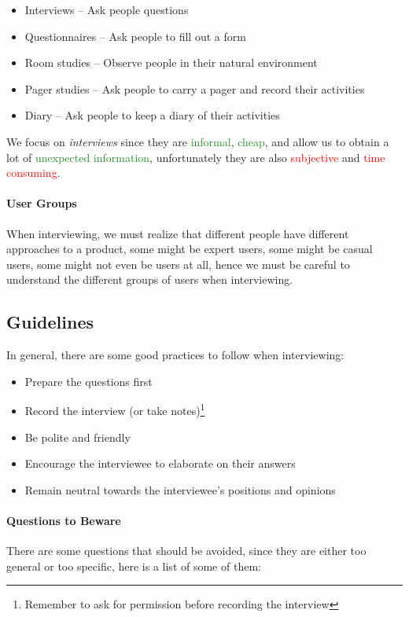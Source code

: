 \documentclass[openright, twoside, twocolumn]{report}
\begin{document}
    \begin{itemize}
      \item Interviews -- Ask people questions
      \item Questionnaires -- Ask people to fill out a form
      \item Room studies -- Observe people in their natural environment
      \item Pager studies -- Ask people to carry a pager and record their activities
      \item Diary -- Ask people to keep a diary of their activities
    \end{itemize}

    We focus on \emph{interviews} since they are \textcolor{ForestGreen}{informal}, \textcolor{ForestGreen}{cheap}, and allow us to obtain a lot of \textcolor{ForestGreen}{unexpected information}, unfortunately they are also
    \textcolor{Red}{subjective} and \textcolor{Red}{time consuming}.

    \paragraph{User Groups}
    When interviewing, we must realize that different people have different approaches to a product, some might be expert users, some might be casual users, some might not even be users at all, hence we must be careful to understand the different groups of users when interviewing.

    \subsection{Guidelines}
    In general, there are some good practices to follow when interviewing:

    \begin{itemize}
      \item Prepare the questions first
      \item Record the interview (or take notes)\footnote{
        Remember to ask for permission before recording the interview
      }
      \item Be polite and friendly
      \item Encourage the interviewee to elaborate on their answers
      \item Remain neutral towards the interviewee's positions and opinions
    \end{itemize}

    \paragraph{Questions to Beware}
    There are some questions that should be avoided, since they are either too general or too specific,
    here is a list of some of them:
\end{document}
